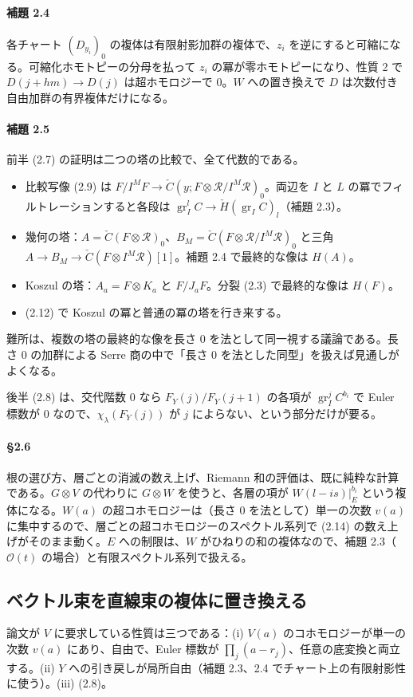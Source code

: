 \documentclass[11pt,a4paper]{ltjsarticle}
\theoremstyle{plain}
\theoremstyle{definition}
\newcommand{\gr}{\operatorname{gr}}
\newcommand{\cO}{\mathcal{O}}
\newcommand{\cR}{\mathcal{R}}
\begin{document}
\paragraph{補題 2.4}
各チャート $(D_{y_i})_0$ の複体は有限射影加群の複体で、$z_i$ を逆にすると可縮になる。可縮化ホモトピーの分母を払って $z_i$ の冪が零ホモトピーになり、性質 2 で $D(j+hm)\to D(j)$ は超ホモロジーで $0$。$W$ への置き換えで $D$ は次数付き自由加群の有界複体だけになる。

\paragraph{補題 2.5}
前半 (2.7) の証明は二つの塔の比較で、全て代数的である。
\begin{itemize}
  \item 比較写像 (2.9) は $F/I^MF\to\check C(y;F\otimes\cR/I^M\cR)_0$。両辺を $I$ と $L$ の冪でフィルトレーションすると各段は $\gr^l_IC\to\check H(\gr_IC)_l$（補題 2.3）。
  \item 幾何の塔：$A = \check C(F\otimes\cR)_0$、$B_M = \check C(F\otimes\cR/I^M\cR)_0$ と三角 $A\to B_M\to\check C(F\otimes I^M\cR)[1]$。補題 2.4 で最終的な像は $H(A)$。
  \item Koszul の塔：$A_a = F\otimes K_a$ と $F/J_aF$。分裂 (2.3) で最終的な像は $H(F)$。
  \item (2.12) で Koszul の冪と普通の冪の塔を行き来する。
\end{itemize}
難所は、複数の塔の最終的な像を長さ $0$ を法として同一視する議論である。長さ $0$ の加群による Serre 商の中で「長さ $0$ を法とした同型」を扱えば見通しがよくなる。

後半 (2.8) は、交代階数 $0$ なら $F_Y(j)/F_Y(j+1)$ の各項が $\gr^j_IC^{b_i}$ で Euler 標数が $0$ なので、$\chi_\lambda(F_Y(j))$ が $j$ によらない、という部分だけが要る。

\paragraph{\S2.6}
根の選び方、層ごとの消滅の数え上げ、Riemann 和の評価は、既に純粋な計算である。$G\otimes V$ の代わりに $G\otimes W$ を使うと、各層の項が $W(l-is)|_E^{b_i}$ という複体になる。$W(a)$ の超コホモロジーは（長さ $0$ を法として）単一の次数 $v(a)$ に集中するので、層ごとの超コホモロジーのスペクトル系列で (2.14) の数え上げがそのまま動く。$E$ への制限は、$W$ がひねりの和の複体なので、補題 2.3（$\cO(t)$ の場合）と有限スペクトル系列で扱える。

\subsection{ベクトル束を直線束の複体に置き換える}\label{app:W}
論文が $V$ に要求している性質は三つである：(i) $V(a)$ のコホモロジーが単一の次数 $v(a)$ にあり、自由で、Euler 標数が $\prod_j(a-r_j)$、任意の底変換と両立する。(ii) $Y$ への引き戻しが局所自由（補題 2.3、2.4 でチャート上の有限射影性に使う）。(iii) (2.8)。
\end{document}
